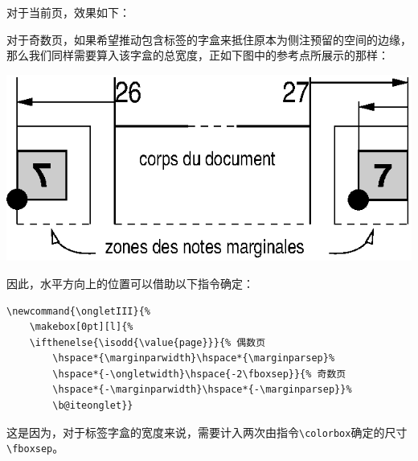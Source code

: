 对于当前页，效果如下：

\newcommand{\ongletII}{%
    \makebox[0pt][l]{%
    \ifthenelse{\isodd{\value{page}}}{%
      \hspace*{\marginparwidth}%
      \hspace*{\marginparsep}}{%
      \hspace*{-\marginparwidth}%
      \hspace*{-\marginparsep}}%
      \biteonglet}}

\ifthenelse{\isodd{\value{page}}}{%
\begin{flushright}
\bfseries\thepage\ongletII\\
\rule{\textwidth}{.4pt}
\end{flushright}}{%
\begin{flushleft}
\ongletII\bfseries\thepage\\
\rule{\textwidth}{.4pt}
\end{flushleft}}

对于奇数页，如果希望推动包含标签的字盒来抵住原本为侧注预留的空间的边缘，那么我们同样需要算入该字盒的总宽度，正如下图中的参考点所展示的那样：

\begin{center}
  \includegraphics[width=.45\textwidth]{img/onglets}
\end{center}

因此，水平方向上的位置可以借助以下指令确定：

\begin{dmd}
\begin{verbatim}
\newcommand{\ongletIII}{%
    \makebox[0pt][l]{%
    \ifthenelse{\isodd{\value{page}}}{% 偶数页
        \hspace*{\marginparwidth}\hspace*{\marginparsep}%
        \hspace*{-\ongletwidth}\hspace{-2\fboxsep}}{% 奇数页
        \hspace*{-\marginparwidth}\hspace*{-\marginparsep}}%
        \b@iteonglet}}
\end{verbatim}
\end{dmd}

这是因为，对于标签字盒的宽度来说，需要计入两次由指令\verb|\colorbox|确定的尺寸\verb|\fboxsep|。

